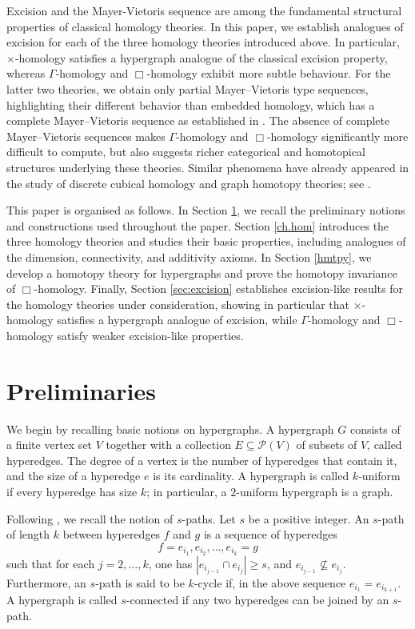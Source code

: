 \documentclass[11pt]{amsart}
\begin{document}
Excision and the Mayer-Vietoris sequence are among the fundamental structural properties of classical homology theories. In this paper, we establish analogues of excision for each of the three homology theories introduced above. In particular, $\times$-homology satisfies a hypergraph analogue of the classical excision property, whereas $\Gamma$-homology and $\Box$-homology exhibit more subtle behaviour. For the latter two theories, we obtain only partial Mayer--Vietoris type sequences, highlighting their different behavior than embedded homology, which has a complete Mayer--Vietoris sequence as established in \cite{HG_Bressan}. The absence of complete Mayer--Vietoris sequences makes $\Gamma$-homology and $\Box$-homology significantly more difficult to compute, but also suggests richer categorical and homotopical structures underlying these theories. Similar phenomena have already appeared in the study of discrete cubical homology and graph homotopy theories; see \cite{HG_Kapulkin25}.


This paper is organised as follows. In Section \ref{Sec_prelim}, we recall the preliminary notions and constructions used throughout the paper. Section \ref{ch.hom} introduces the three homology theories and studies their basic properties, including analogues of the dimension, connectivity, and additivity axioms. In Section \ref{hmtpy}, we develop a homotopy theory for hypergraphs and prove the homotopy invariance of $\Box$-homology. Finally, Section \ref{sec:excision} establishes excision-like results for the homology theories under consideration, showing in particular that $\times$-homology satisfies a hypergraph analogue of excision, while $\Gamma$-homology and $\Box$-homology satisfy weaker excision-like properties.



\section{Preliminaries}\label{Sec_prelim}
We begin by recalling basic notions on hypergraphs. A hypergraph $G$ consists of a finite vertex set $V$ together with a collection $E \subseteq \mathcal{P}(V)$ of subsets of $V$, called hyperedges. The degree of a vertex is the number of hyperedges that contain it, and the size of a hyperedge $e$ is its cardinality. A hypergraph is called $k$-uniform if every hyperedge has size $k$; in particular, a $2$-uniform hypergraph is a graph.

Following \cite{HG_Emilie}, we recall the notion of $s$-paths. Let $s$ be a positive integer. An $s$-path of length $k$ between hyperedges $f$ and $g$ is a sequence of hyperedges
\[
f = e_{i_1}, e_{i_2}, \ldots, e_{i_k} = g
\]
such that for each $j = 2, \ldots, k$, one has $|e_{i_{j-1}} \cap e_{i_j}| \geq s$, and $e_{i_{j-1}} \not\subseteq e_{i_j}$. Furthermore, an $s$-path is said to be $k$-cycle if, in the above sequence $e_{i_1}=e_{i_{k+1}}$. A hypergraph is called $s$-connected if any two hyperedges can be joined by an $s$-path. 
\end{document}
